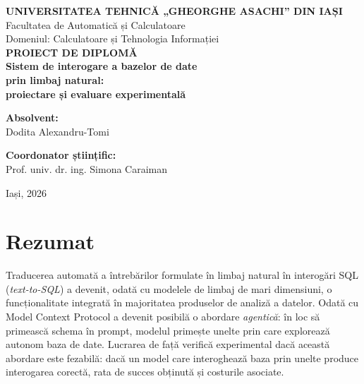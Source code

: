 \documentclass[12pt,a4paper]{report}
\begin{document}
\begin{titlepage}
\centering
\vspace*{0.6cm}

{\large\textbf{UNIVERSITATEA TEHNICĂ „GHEORGHE ASACHI” DIN IAȘI}}\\[0.35cm]
{\large Facultatea de Automatică și Calculatoare}\\[0.25cm]
{\large Domeniul: Calculatoare și Tehnologia Informației}\\[2.6cm]

{\Large\textbf{PROIECT DE DIPLOMĂ}}\\[1.6cm]

{\LARGE\textbf{Sistem de interogare a bazelor de date}}\\[0.35cm]
{\LARGE\textbf{prin limbaj natural:}}\\[0.35cm]
{\LARGE\textbf{proiectare și evaluare experimentală}}\\[3.2cm]

\begin{minipage}[t]{0.46\textwidth}
\raggedright
{\large\textbf{Absolvent:}}\\[0.15cm]
{\large Dodita Alexandru-Tomi}
\end{minipage}
\hfill
\begin{minipage}[t]{0.46\textwidth}
\raggedleft
{\large\textbf{Coordonator științific:}}\\[0.15cm]
{\large Prof. univ. dr. ing. Simona Caraiman}
\end{minipage}

\vfill
{\large Iași, 2026}
\end{titlepage}

\setcounter{page}{2}

\chapter*{Rezumat}

Traducerea automată a întrebărilor formulate în limbaj natural în interogări
SQL (\emph{text-to-SQL}) a devenit, odată cu modelele de limbaj de mari
dimensiuni, o funcționalitate integrată în majoritatea produselor de analiză
a datelor. Odată cu Model Context Protocol a devenit posibilă o abordare
\emph{agentică}: în loc să primească schema în prompt, modelul primește
unelte prin care explorează autonom baza de date. Lucrarea de față verifică
experimental dacă această abordare este fezabilă: dacă un model care
interoghează baza prin unelte produce interogarea corectă, rata de succes
obținută și costurile asociate.
\end{document}
